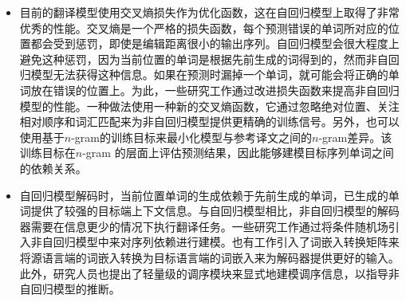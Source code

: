 \begin{itemize}
\vspace{0.5em}
\item 目前的翻译模型使用交叉熵损失作为优化函数，这在自回归模型上取得了非常优秀的性能。交叉熵是一个严格的损失函数，每个预测错误的单词所对应的位置都会受到惩罚，即使是编辑距离很小的输出序列。自回归模型会很大程度上避免这种惩罚，因为当前位置的单词是根据先前生成的词得到的，然而非自回归模型无法获得这种信息。如果在预测时漏掉一个单词，就可能会将正确的单词放在错误的位置上。为此，一些研究工作通过改进损失函数来提高非自回归模型的性能。一种做法使用一种新的交叉熵函数，它通过忽略绝对位置、关注相对顺序和词汇匹配来为非自回归模型提供更精确的训练信号。另外，也可以使用基于$n$-gram的训练目标来最小化模型与参考译文之间的$n$-gram差异。该训练目标在$n$-gram 的层面上评估预测结果，因此能够建模目标序列单词之间的依赖关系。
\vspace{0.5em}
\item 自回归模型解码时，当前位置单词的生成依赖于先前生成的单词，已生成的单词提供了较强的目标端上下文信息。与自回归模型相比，非自回归模型的解码器需要在信息更少的情况下执行翻译任务。一些研究工作通过将条件随机场引入非自回归模型中来对序列依赖进行建模。也有工作引入了词嵌入转换矩阵来将源语言端的词嵌入转换为目标语言端的词嵌入来为解码器提供更好的输入。此外，研究人员也提出了轻量级的调序模块来显式地建模调序信息，以指导非自回归模型的推断。
\vspace{0.5em}
\end{itemize}








